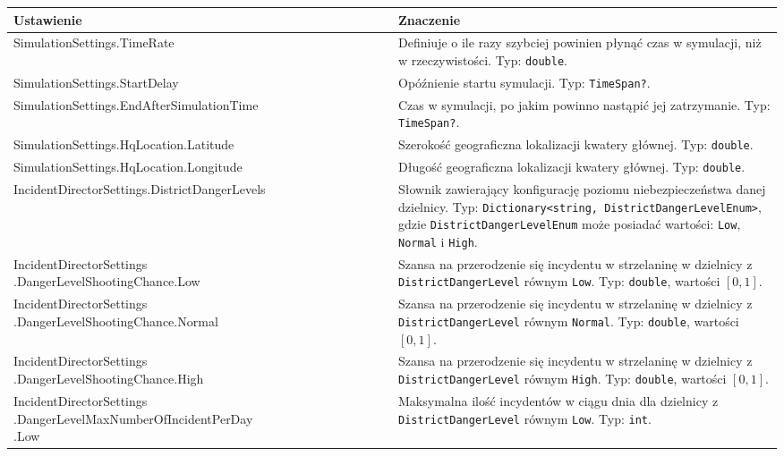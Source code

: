 \begin{longtable}{|p{0.5\linewidth} | p{0.5\linewidth}|} 
     \hline
     Ustawienie & Znaczenie \\
     \hline
     \hline
     SimulationSettings.TimeRate & Definiuje o ile razy szybciej powinien płynąć czas w symulacji, niż w rzeczywistości. Typ: \texttt{double}. \\ 
     \hline
     SimulationSettings.StartDelay & Opóźnienie startu symulacji. Typ: \texttt{TimeSpan?}. \\ 
     \hline
     SimulationSettings.EndAfterSimulationTime & Czas w symulacji, po jakim powinno nastąpić jej zatrzymanie. Typ: \texttt{TimeSpan?}. \\ 
     \hline
     SimulationSettings.HqLocation.Latitude & Szerokość geograficzna lokalizacji kwatery głównej. Typ: \texttt{double}. \\ 
     \hline
     SimulationSettings.HqLocation.Longitude & Długość geograficzna lokalizacji kwatery głównej. Typ: \texttt{double}. \\ 
     \hline
     IncidentDirectorSettings.DistrictDangerLevels & Słownik zawierający konfigurację poziomu niebezpieczeństwa danej dzielnicy. Typ: \texttt{Dictionary<string, DistrictDangerLevelEnum>}, gdzie \texttt{DistrictDangerLevelEnum} może posiadać wartości: \texttt{Low}, \texttt{Normal} i \texttt{High}. \\ 
     \hline
     \makecell[tl]{IncidentDirectorSettings\\.DangerLevelShootingChance.Low} & Szansa na przerodzenie się incydentu w strzelaninę w dzielnicy z \texttt{DistrictDangerLevel} równym \texttt{Low}. Typ: \texttt{double}, wartości $[0, 1]$. \\ 
     \hline
     \makecell[tl]{IncidentDirectorSettings\\.DangerLevelShootingChance.Normal} & Szansa na przerodzenie się incydentu w strzelaninę w dzielnicy z \texttt{DistrictDangerLevel} równym \texttt{Normal}. Typ: \texttt{double}, wartości $[0, 1]$. \\ 
     \hline
     \makecell[tl]{IncidentDirectorSettings\\.DangerLevelShootingChance.High} & Szansa na przerodzenie się incydentu w strzelaninę w dzielnicy z \texttt{DistrictDangerLevel} równym \texttt{High}. Typ: \texttt{double}, wartości $[0, 1]$. \\ 
     \hline
     \makecell[tl]{IncidentDirectorSettings\\.DangerLevelMaxNumberOfIncidentPerDay\\.Low} & Maksymalna ilość incydentów w ciągu dnia dla dzielnicy z \texttt{DistrictDangerLevel} równym \texttt{Low}. Typ: \texttt{int}. \\ 

\end{longtable}
